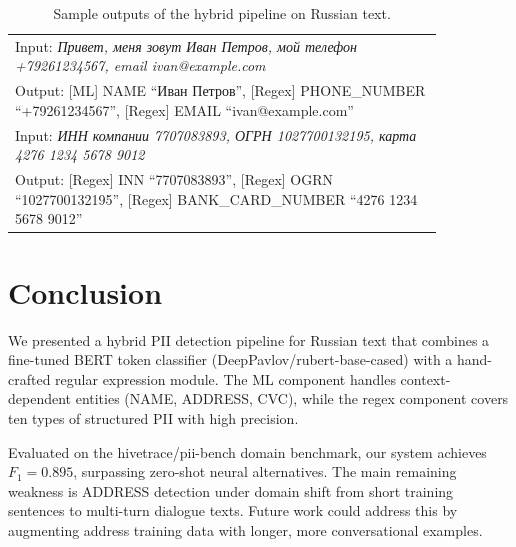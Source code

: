 \documentclass{article}
\begin{document}
\begin{table}[!tbh]
    \centering
    \begin{tabular}{|p{0.85\linewidth}|}
\hline
Input: \textit{Привет, меня зовут Иван Петров, мой телефон +79261234567, email ivan@example.com} \\
Output: [ML] NAME ``Иван Петров'', [Regex] PHONE\_NUMBER ``+79261234567'', [Regex] EMAIL ``ivan@example.com'' \\
\hline
Input: \textit{ИНН компании 7707083893, ОГРН 1027700132195, карта 4276 1234 5678 9012} \\
Output: [Regex] INN ``7707083893'', [Regex] OGRN ``1027700132195'', [Regex] BANK\_CARD\_NUMBER ``4276 1234 5678 9012'' \\
\hline
    \end{tabular}
    \caption{Sample outputs of the hybrid pipeline on Russian text.}
    \label{tab:output}
\end{table}

\section{Conclusion}

We presented a hybrid PII detection pipeline for Russian text that combines a fine-tuned BERT token classifier (DeepPavlov/rubert-base-cased) with a hand-crafted regular expression module. The ML component handles context-dependent entities (NAME, ADDRESS, CVC), while the regex component covers ten types of structured PII with high precision.

Evaluated on the hivetrace/pii-bench domain benchmark, our system achieves $F_1 = 0.895$, surpassing zero-shot neural alternatives. The main remaining weakness is ADDRESS detection under domain shift from short training sentences to multi-turn dialogue texts. Future work could address this by augmenting address training data with longer, more conversational examples.
\end{document}
